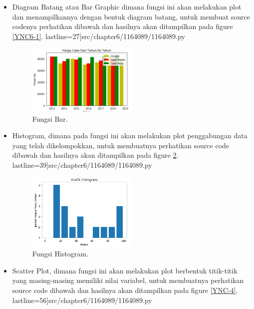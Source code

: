 \begin{enumerate}
	\begin{itemize}

		\item Diagram Batang atau Bar Graphic dimana fungsi ini akan melakukan plot dan menampilkannya dengan bentuk diagram 			         batang, untuk membuat source codenya perhatikan dibawah dan hasilnya akan ditampilkan pada figure \ref{YNC6-1}.
		          lastline=27]{src/chapter6/1164089/1164089.py}

			\begin{figure}[!htbp!]
				\centerline{\includegraphics[width=0.5\textwidth]{figures/chapter6/1164089/YNC6-2.png}}
				\caption{Fungsi Bar.}
				\label{YNC6-2}
			\end{figure}

		\item Histogram, dimana pada fungsi ini akan melakukan plot penggabungan data yang telah dikelompokkan, untuk 				         membuatnya perhatikan source code dibawah dan hasilnya akan ditampilkan pada figure \ref{YNC6-3}.
		          lastline=39]{src/chapter6/1164089/1164089.py}

			\begin{figure}[!htbp!]
				\centerline{\includegraphics[width=0.5\textwidth]{figures/chapter6/1164089/YNC6-3.png}}
				\caption{Fungsi Histogram.}
				\label{YNC6-3}
			\end{figure}

		\item Scatter Plot, dimana fungsi ini akan melakukan plot berbentuk titik-titik yang masing-masing memiliki nilai variabel, 				         untuk membuatnya perhatikan source code dibawah dan hasilnya akan ditampilkan pada figure \ref{YNC-4}.
		         lastline=56]{src/chapter6/1164089/1164089.py}


\end{itemize}
\end{enumerate}

